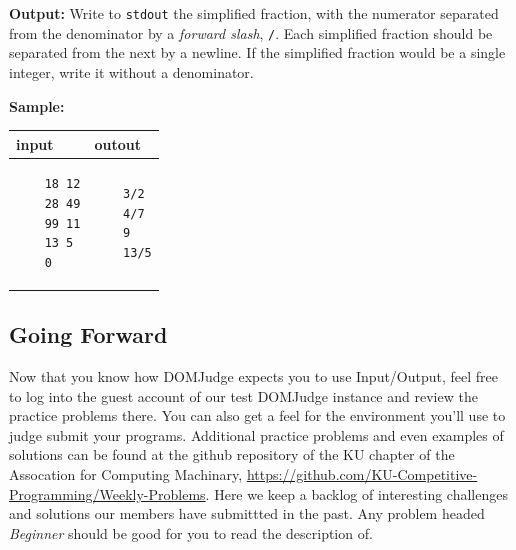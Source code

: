 \documentclass[a4paper]{article}
\begin{document}
\textbf{Output:} Write to \texttt{stdout} the simplified fraction, with the numerator separated from the denominator by a \textit{forward slash}, \texttt{/}. Each simplified fraction should be separated from the next by a newline. If the simplified fraction would be a single integer, write it without a denominator.  

\textbf{Sample:}

\begin{tabular}{|p{}|p{}|}
    \hline
    \textbf{input} & \textbf{outout} \\
    \hline
    \begin{verbatim}
    18 12
    28 49
    99 11
    13 5
    0
    \end{verbatim} &
    \begin{verbatim}
    3/2
    4/7
    9
    13/5
    \end{verbatim} \\
    \hline
\end{tabular}
\newpage

\subsection{Going Forward}
Now that you know how DOMJudge expects you to use Input/Output, feel free to log into the guest account of our test DOMJudge instance and review the practice problems there. You can also get a feel for the environment you'll use to judge submit your programs. Additional practice problems and even examples of solutions can be found at the github repository of the KU chapter of the Assocation for Computing Machinary, \url{https://github.com/KU-Competitive-Programming/Weekly-Problems}. Here we keep a backlog of interesting challenges and solutions our members have submittted in the past. Any problem headed \textit{Beginner} should be good for you to read the description of. 
\end{document}
